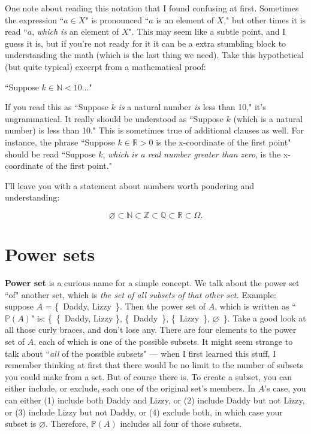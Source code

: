 One note about reading this notation that I found confusing at first.
Sometimes the expression ``$a \in X$" is pronounced ``$a$ is an element of
$X$," but other times it is read ``$a$, \textit{which is} an element of
$X$". This may seem like a subtle point, and I guess it is, but if you're
not ready for it it can be a extra stumbling block to understanding the
math (which is the last thing we need). Take this hypothetical (but quite
typical) excerpt from a mathematical proof:

\begin{center}
``Suppose $k \in \mathbb{N} < 10\dots$"
\end{center}

If you read this as ``Suppose $k$ \textit{is} a natural number \textit{is}
less than 10," it's ungrammatical. It really should be understood as
``Suppose $k$ (which is a natural number) is less than 10." This is
sometimes true of additional clauses as well. For instance, the phrase
``Suppose $k \in \mathbb{R} > 0$ is the x-coordinate of the first
point" should be read ``Suppose $k$, \textit{which is a real number
greater than zero}, is the x-coordinate of the first point."

I'll leave you with a statement about numbers worth pondering and
understanding:

\[
\varnothing \subset 
\mathbb{N} \subset
\mathbb{Z} \subset
\mathbb{Q} \subset
\mathbb{R} \subset
\Omega.
\]


\section{Power sets}

\textbf{Power set} is a curious name for a simple concept. We talk about
the power set ``of" another set, which is \textit{the set of all subsets of
that other set.} Example: suppose $A$ = \{~Daddy, Lizzy~\}. Then the power
set of $A$, which is written as ``$\mathbb{P}(A)$" is: \{~\{~Daddy, Lizzy
\}, \{~Daddy~\}, \{~Lizzy~\}, $\varnothing$~\}. Take a good look at all
those curly braces, and don't lose any. There are four elements to the
power set of $A$, each of which is one of the possible subsets. It might
seem strange to talk about ``\textit{all} of the possible subsets" --- when
I first learned this stuff, I remember thinking at first that there would
be no limit to the number of subsets you could make from a set. But of
course there is.  To create a subset, you can either include, or exclude,
each one of the original set's members. In $A$'s case, you can either (1)
include both Daddy and Lizzy, or (2) include Daddy but not Lizzy, or (3)
include Lizzy but not Daddy, or (4) exclude both, in which case your subset
is $\varnothing$. Therefore, $\mathbb{P}(A)$ includes all four of those
subsets.

